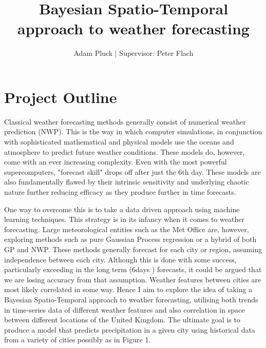 \documentclass[13pt]{article}
\title{\vspace{-2.0cm}Bayesian Spatio-Temporal approach to weather forecasting\vspace{-2ex}}
\author{\vspace{-5.0cm}Adam Pluck | Supervisor: Peter Flach}\vspace{-3ex}
\date{\vspace{-2ex}}
\begin{document}
\maketitle


\section{Project Outline}

Classical weather forecasting methods generally consist of numerical weather prediction (NWP). This is the way in which computer simulations, in conjunction with sophisticated mathematical and physical models use the oceans and atmosphere to predict future weather conditions. These models do, however, come with an ever increasing complexity. Even with the most powerful supercomputers, "forecast skill" drops off after just the 6th day. These models are also fundamentally flawed by their intrinsic sensitivity and underlying chaotic nature further reducing efficacy as they produce further in time forecasts.

One way to overcome this is to take a data driven approach using machine learning techniques. This strategy is in its infancy when it comes to weather forecasting. Large meteorological entities such as the Met Office are, however, exploring methods such as pure Gaussian Process regression or a hybrid of both GP and NWP. These methods generally forecast for each city or region, assuming independence between each city. Although this is done with some success, particularly exceeding in the long term (6days \text{+}) forecasts, it could be argued that we are losing accuracy from that assumption. Weather features between cities are most likely correlated in some way. Hence I aim to explore the idea of taking a Bayesian Spatio-Temporal approach to weather forecasting, utilising both trends in time-series data of different weather features and also correlation in space between different locations of the United Kingdom. The ultimate goal is to produce a model that predicts precipitation in a given city using historical data from a variety of cities possibly as in Figure 1.
\end{document}
